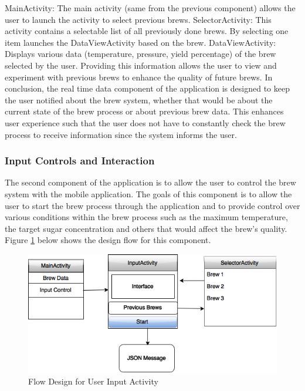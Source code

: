 \documentclass{article}
\begin{document}
MainActivity: The main activity (same from the previous component) allows the user to launch the activity to select previous brews.
SelectorActivity: This activity contains a selectable list of all previously done brews. By selecting one item launches the DataViewActivity based on the brew.
DataViewActivity: Displays various data (temperature, pressure, yield percentage) of the brew selected by the user.
Providing this information allows the user to view and experiment with previous brews to enhance the quality of future brews. 
In conclusion, the real time data component of the application is designed to keep the user notified about the brew system, whether that would be about the current state of the brew process or about previous brew data. This enhances user experience such that the user does not have to constantly check the brew process to receive information since the system informs the user.

\subsubsection{Input Controls and Interaction}
The second component of the application is to allow the user to control the brew system with the mobile application. The goals of this component is to allow the user to start the brew process through the application and to provide control over various conditions within the brew process such as the maximum temperature, the target sugar concentration and others that would affect the brew's quality. Figure \ref{fig:input-activity} below shows the design flow for this component.

\begin{figure}[H]
\begin{center}
\includegraphics[scale=0.50]{input-activity.png}
\caption{Flow Design for User Input Activity}
\label{fig:input-activity}
\end{center}
\end{figure}
\end{document}
